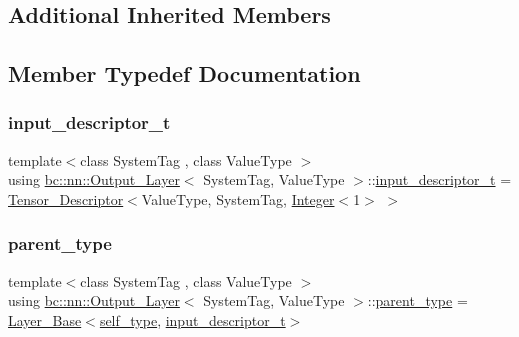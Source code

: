 \subsection*{Additional Inherited Members}


\subsection{Member Typedef Documentation}
\mbox{\label{structbc_1_1nn_1_1Output__Layer_adbc7c287b6f4b0dda68801784a6c6ca9}} 
\subsubsection{\texorpdfstring{input\+\_\+descriptor\+\_\+t}{input\_descriptor\_t}}
{\footnotesize\ttfamily template$<$class System\+Tag , class Value\+Type $>$ \\
using \hyperlink{structbc_1_1nn_1_1Output__Layer}{bc\+::nn\+::\+Output\+\_\+\+Layer}$<$ System\+Tag, Value\+Type $>$\+::\hyperlink{structbc_1_1nn_1_1Output__Layer_adbc7c287b6f4b0dda68801784a6c6ca9}{input\+\_\+descriptor\+\_\+t} =  \hyperlink{structbc_1_1nn_1_1Tensor__Descriptor}{Tensor\+\_\+\+Descriptor}$<$Value\+Type, System\+Tag, \hyperlink{structbc_1_1traits_1_1Integer}{Integer}$<$1$>$ $>$}

\mbox{\label{structbc_1_1nn_1_1Output__Layer_ad625d63978c4e6b396d4ef52062515d0}} 
\subsubsection{\texorpdfstring{parent\+\_\+type}{parent\_type}}
{\footnotesize\ttfamily template$<$class System\+Tag , class Value\+Type $>$ \\
using \hyperlink{structbc_1_1nn_1_1Output__Layer}{bc\+::nn\+::\+Output\+\_\+\+Layer}$<$ System\+Tag, Value\+Type $>$\+::\hyperlink{structbc_1_1nn_1_1Output__Layer_ad625d63978c4e6b396d4ef52062515d0}{parent\+\_\+type} =  \hyperlink{structbc_1_1nn_1_1Layer__Base}{Layer\+\_\+\+Base}$<$\hyperlink{structbc_1_1nn_1_1Output__Layer_ab795d02d54671c4235286a01e6bca7b9}{self\+\_\+type}, \hyperlink{structbc_1_1nn_1_1Output__Layer_adbc7c287b6f4b0dda68801784a6c6ca9}{input\+\_\+descriptor\+\_\+t}$>$}

